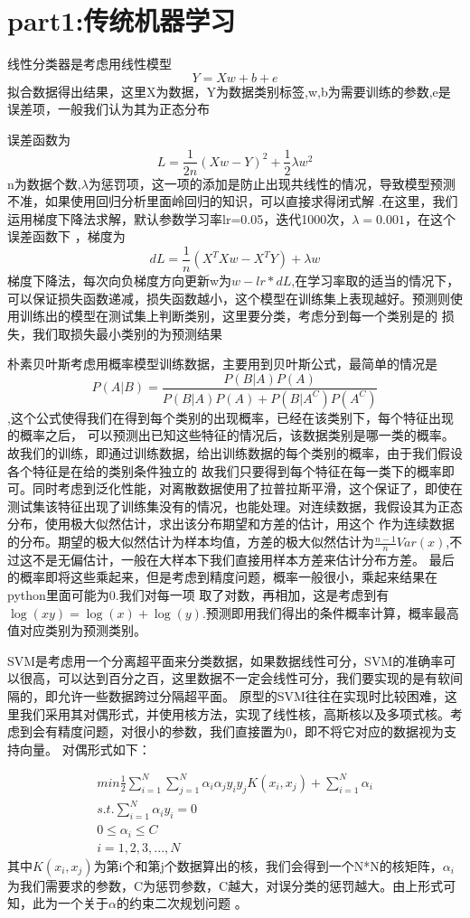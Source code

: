 \documentclass{report}
\begin{document}
    \section{part1:传统机器学习}
    线性分类器是考虑用线性模型$$Y=Xw+b+e$$拟合数据得出结果，这里X为数据，Y为数据类别标签,w,b为需要训练的参数,e是误差项，一般我们认为其为正态分布\par
    误差函数为$$L=\frac{1}{2n}(Xw-Y)^2+\frac{1}{2}\lambda w^2$$n为数据个数,$\lambda$为惩罚项，这一项的添加是防止出现共线性的情况，导致模型预测不准，如果使用回归分析里面岭回归的知识，可以直接求得闭式解 
    .在这里，我们运用梯度下降法求解，默认参数学习率lr=0.05，迭代1000次，$\lambda=0.001$，在这个误差函数下
    ，梯度为$$dL=\frac{1}{n}(X^TXw-X^TY)+\lambda w$$梯度下降法，每次向负梯度方向更新w为$w-lr*dL$,在学习率取的适当的情况下，
    可以保证损失函数递减，损失函数越小，这个模型在训练集上表现越好。预测则使用训练出的模型在测试集上判断类别，这里要分类，考虑分到每一个类别是的
    损失，我们取损失最小类别的为预测结果\par 
    朴素贝叶斯考虑用概率模型训练数据，主要用到贝叶斯公式，最简单的情况是$$P(A|B)=\frac{P(B|A)P(A)}{P(B|A)P(A)+P(B|A^C)P(A^C)}$$,这个公式使得我们在得到每个类别的出现概率，已经在该类别下，每个特征出现的概率之后，
    可以预测出已知这些特征的情况后，该数据类别是哪一类的概率。故我们的训练，即通过训练数据，给出训练数据的每个类别的概率，由于我们假设各个特征是在给的类别条件独立的
    故我们只要得到每个特征在每一类下的概率即可。同时考虑到泛化性能，对离散数据使用了拉普拉斯平滑，这个保证了，即使在测试集该特征出现了训练集没有的情况，也能处理。对连续数据，我假设其为正态分布，使用极大似然估计，求出该分布期望和方差的估计，用这个
    作为连续数据的分布。期望的极大似然估计为样本均值，方差的极大似然估计为$\frac{n-1}{n}Var(x)$,不过这不是无偏估计，一般在大样本下我们直接用样本方差来估计分布方差。
    最后的概率即将这些乘起来，但是考虑到精度问题，概率一般很小，乘起来结果在python里面可能为0.我们对每一项
    取了对数，再相加，这是考虑到有$\log(xy)=\log(x)+\log(y)$.预测即用我们得出的条件概率计算，概率最高值对应类别为预测类别。\par 
    SVM是考虑用一个分离超平面来分类数据，如果数据线性可分，SVM的准确率可以很高，可以达到百分之百，这里数据不一定会线性可分，我们要实现的是有软间隔的，即允许一些数据跨过分隔超平面。
    原型的SVM往往在实现时比较困难，这里我们采用其对偶形式，并使用核方法，实现了线性核，高斯核以及多项式核。考虑到会有精度问题，对很小的参数，我们直接置为0，即不将它对应的数据视为支持向量。
    对偶形式如下：

    \begin{gather*}
        min \frac{1}{2}\sum_{i=1}^N\sum_{j=1}^{N}\alpha_i\alpha_jy_iy_jK(x_i,x_j)+\sum_{i=1}^{N}\alpha_{i} \\
        s.t. \sum_{i=1}^{N}\alpha_iy_i=0 \\
        0 \leq \alpha_i \leq C\\
        i=1,2,3,...,N
    \end{gather*}
    其中$K(x_i,x_j)$为第i个和第j个数据算出的核，我们会得到一个N*N的核矩阵，$\alpha_i$为我们需要求的参数，C为惩罚参数，C越大，对误分类的惩罚越大。由上形式可知，此为一个关于$\alpha$的约束二次规划问题
    。\par 
\end{document}
